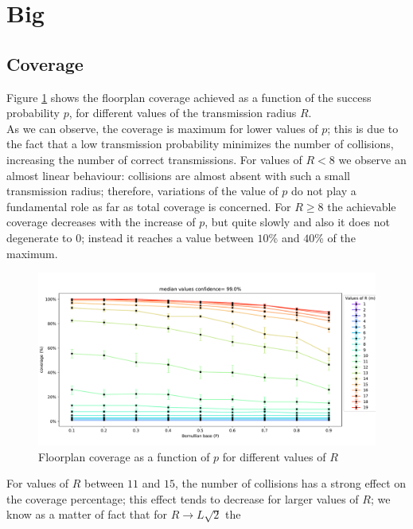 \section{Big}\label{big}
\subsection{Coverage}
Figure \ref{fig:floorplancoverage1} shows the floorplan coverage achieved as a
function of the success probability $p$, for different values of
the transmission radius $R$. \\
As we can observe, the coverage is maximum
for lower values of $p$; this is due to the fact that a low transmission
probability minimizes the number of collisions, increasing the number of correct
transmissions. For values of $R < 8$ we observe an almost linear behaviour:
collisions are almost absent with such a small transmission radius; therefore,
variations of the value of $p$ do not play a fundamental role as far as total coverage is
concerned. For $R \geq 8$ the achievable coverage
decreases with the increase of $p$, but quite slowly and also it does not
degenerate to $0$; instead it reaches a value between $10$\% and $40$\% of the
maximum.
\begin{figure}[H]
    \begin{center}
        \includegraphics[scale=.42]{img/Big_CovP_median.pdf}
    \end{center}
    \vspace*{-0.5cm}
    \caption{Floorplan coverage as a function of $p$ for different values of $R$}
    \label{fig:floorplancoverage1}
\end{figure}
\noindent
For values of $R$ between $11$ and $15$, the number of collisions has a strong
effect on the coverage percentage; this effect tends to decrease for larger
values of $R$; we know as a matter of fact that for $R \to L\sqrt{2}$ the
